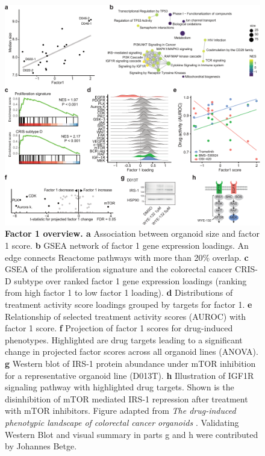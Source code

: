 \begin{flushleft}
\begin{figure}[h!]
\centering
\includegraphics[width=\textwidth,
                height=\textheight,
                keepaspectratio]{figures/promise/pdf/fig_6_1.pdf}
\caption[Factor 1 overview]{\textbf{Factor 1 overview. a} Association between organoid size and factor 1 score. \textbf{b} GSEA network of factor 1 gene expression loadings. An edge connects Reactome pathways with more than 20\% overlap. \textbf{c} GSEA of the proliferation signature and the colorectal cancer CRIS-D subtype over ranked factor 1 gene expression loadings (ranking from high factor 1 to low factor 1 loading). \textbf{d} Distributions of treatment activity score loadings grouped by targets for factor 1. \textbf{e} Relationship of selected treatment activity scores (AUROC) with factor 1 score. \textbf{f} Projection of factor 1 scores for drug-induced phenotypes. Highlighted are drug targets leading to a significant change in projected factor scores across all organoid lines (ANOVA). \textbf{g} Western blot of IRS-1 protein abundance under mTOR inhibition for a representative organoid line (D013T). \textbf{h} Illustration of IGF1R signaling pathway with highlighted drug targets. Shown is the disinhibition of mTOR mediated IRS-1 repression after treatment with mTOR inhibitors. Figure adapted from \textit{The drug-induced phenotypic landscape of colorectal cancer organoids} \parencite{betgeDruginducedPhenotypicLandscape2022}. Validating Western Blot and visual summary in parts g and h were contributed by Johannes Betge.}
\label{fig_261}
\end{figure}
\bigbreak


\end{flushleft}
